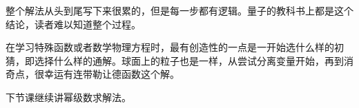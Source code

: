 整个解法从头到尾写下来很累的，但是每一步都有逻辑。量子的教科书上都是这个结论，读者难以知道整个过程。

在学习特殊函数或者数学物理方程时，最有创造性的一点是一开始选什么样的初猜，即选择什么样的通解。球面上的粒子也是一样，从尝试分离变量开始，再到消奇点，很幸运有连带勒让德函数这个解。

下节课继续讲幂级数求解法。











